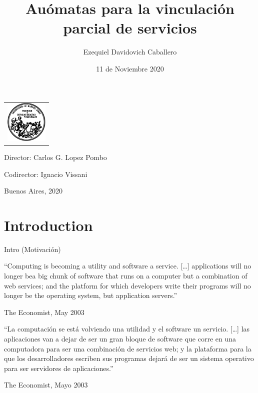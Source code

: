 \documentclass[10pt,xcolor={table,dvipsnames},t]{beamer}
\title{Auómatas para la vinculación parcial de servicios}
\author{Ezequiel Davidovich Caballero}
\institute{Departamento de Computación, Facultad de Ciencias Exactas y Naturales}
\date{11 de Noviembre 2020}
\begin{document}
\begin{frame}
\vspace{-2cm}
\begin{center}
\begin{tabular}{l}
\includegraphics[width=2cm]{logofcen.pdf}
\end{tabular}    
\end{center}

  \titlepage
  
  {

{Director: Carlos G. Lopez Pombo}

\vspace{.2cm}

{Codirector: Ignacio Vissani}

\vspace{.2cm}

Buenos Aires, 2020
}
\end{frame}


\section{Introduction}
\begin{frame}{Intro (Motivación)}
\begin{center}
    “Computing is becoming a utility and software a service. […] applications will no longer bea big chunk of software that runs on a computer but a combination of web services; and the platform for which developers write their programs will no longer be the operating system, but application servers.”
\end{center}
The Economist, May 2003
\begin{center}
“La computación se está volviendo una utilidad y el software un servicio. […] las aplicaciones van a dejar de ser un gran bloque de software que corre en una computadora para ser una combinación de servicios web; y la plataforma para la que los desarrolladores escriben sus programas dejará de ser un sistema operativo para ser servidores de aplicaciones.”    
\end{center}
The Economist, Mayo 2003
\end{frame}
\end{document}
